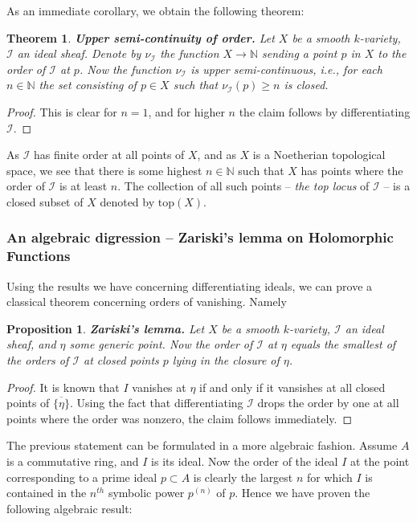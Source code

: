 \documentclass[12pt,a4paper,leqno]{article}
\newcommand{\N}{\mathbb{N}}
\theoremstyle{plain}
\newtheorem{thm}[theo]{Theorem}
\newtheorem{prop}[theo]{Proposition}
\theoremstyle{definition}
\theoremstyle{remark}
\begin{document}
As an immediate corollary, we obtain the following theorem:

\begin{thm}
\textbf{Upper semi-continuity of order.} Let $X$ be a smooth $k$-variety, $\mathscr{I}$ an ideal sheaf. Denote by $\nu_{\mathscr{I}}$ the function $X \to \N$ sending a point $p$ in $X$ to the order of $\mathscr{I}$ at $p$. Now the function $\nu_\mathscr{I}$ is upper semi-continuous, i.e., for each $n \in \N$ the set consisting of $p \in X$ such that $\nu_\mathscr{I} (p) \geq n$ is closed. 
\end{thm}
\begin{proof}
This is clear for $n=1$, and for higher $n$ the claim follows by differentiating $\mathscr{I}$.
\end{proof}

As $\mathscr I$ has finite order at all points of $X$, and as $X$ is a Noetherian topological space, we see that there is some highest $n \in \N$ such that $X$ has points where the order of $\mathscr{I}$ is at least $n$. The collection of all such points -- \emph{the top locus} of $\mathscr I$ -- is a closed subset of $X$ denoted by $\mathrm{top} (X)$.

\subsubsection*{An algebraic digression -- Zariski's lemma on Holomorphic Functions}

Using the results we have concerning differentiating ideals, we can prove a classical theorem concerning orders of vanishing. Namely

\begin{prop}
\textbf{Zariski's lemma.} Let $X$ be a smooth $k$-variety, $\mathscr{I}$ an ideal sheaf, and $\eta$ some generic point. Now the order of $\mathscr{I}$ at $\eta$ equals the smallest of the orders of $\mathscr{I}$ at closed points $p$ lying in the closure of $\eta$. 
\end{prop}
\begin{proof}
It is known that $I$ vanishes at $\eta$ if and only if it vansishes at all closed points of $\overline{\{\eta\}}$. Using the fact that differentiating $\mathscr{I}$ drops the order by one at all points where the order was nonzero, the claim follows immediately.
\end{proof}

The previous statement can be formulated in a more algebraic fashion. Assume $A$ is a commutative ring, and $I$ is its ideal. Now the order of the ideal $I$ at the point corresponding to a prime ideal $p \subset A$ is clearly the largest $n$ for which $I$ is contained in the $n^{th}$ symbolic power $p^{(n)}$ of $p$. Hence we have proven the following algebraic result:
\end{document}
